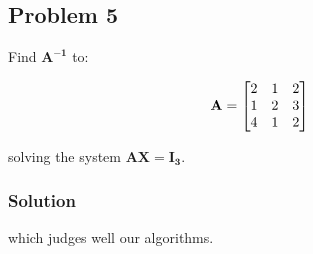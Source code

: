 \subsection{Problem 5}
Find $\mathbf{A^{-1}}$ to:

\begin{equation*}
    \mathbf{A} = 
    \begin{bmatrix}
        2 & 1 & 2 \\
        1 & 2 & 3 \\
        4 & 1 & 2 
    \end{bmatrix}
\end{equation*}

solving the system $\mathbf{AX=I_{3}}$.

\subsubsection*{Solution}

which judges well our algorithms.
